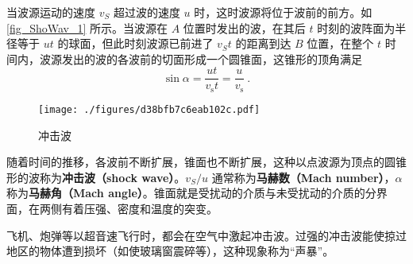 
当波源运动的速度 $v_S$ 超过波的速度 $u $ 时，这时波源将位于波前的前方。如\autoref{fig_ShoWav_1} 所示。当波源在 $A $ 位置时发出的波，在其后 $t $ 时刻的波阵面为半径等于 $ut $ 的球面，但此时刻波源已前进了 $v_St$ 的距离到达 $B $ 位置，在整个 $t $ 时间内，波源发出的波的各波前的切面形成一个圆锥面，这锥形的顶角满足
\begin{equation}
\sin \alpha=\frac{u t}{v_{\mathrm{s}} t}=\frac{u}{v_{\mathrm{s}}}~.
\end{equation}
\begin{figure}[ht]
\centering
\texttt{[image: ./figures/d38bfb7c6eab102c.pdf]}
\caption{冲击波} \label{fig_ShoWav_1}
\end{figure}
随着时间的推移，各波前不断扩展，锥面也不断扩展，这种以点波源为顶点的圆锥形的波称为\textbf{冲击波（shock wave）}。$v_S/u$ 通常称为\textbf{马赫数（Mach number）}，$\alpha$ 称为\textbf{马赫角（Mach angle）}。锥面就是受扰动的介质与未受扰动的介质的分界面，在两侧有着压强、密度和温度的突变。

飞机、炮弹等以超音速飞行时，都会在空气中激起冲击波。过强的冲击波能使掠过地区的物体遭到损坏（如使玻璃窗震碎等），这种现象称为“声暴”。
